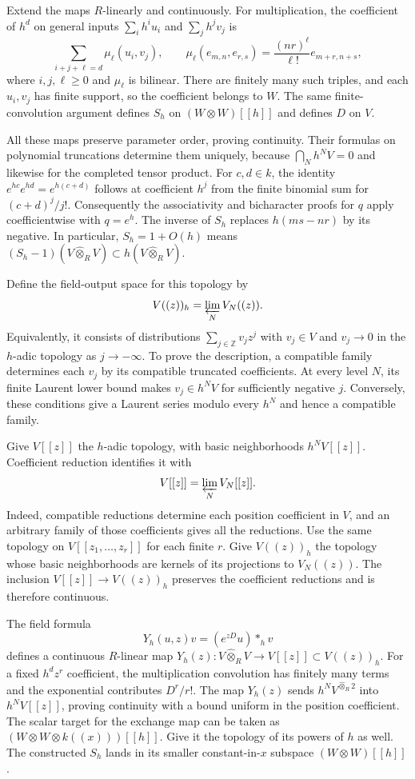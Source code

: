 Extend the maps $R$-linearly and continuously.
For multiplication, the coefficient of $h^d$ on general inputs
$\sum_i h^iu_i$ and $\sum_j h^jv_j$ is
\[
 \sum_{i+j+\ell=d}\mu_\ell(u_i,v_j),\qquad
 \mu_\ell(e_{m,n},e_{r,s})=\frac{(nr)^\ell}{\ell!}e_{m+r,n+s},
\]
where $i,j,\ell\geq0$ and $\mu_\ell$ is bilinear.
There are finitely many such triples, and each $u_i,v_j$ has
finite support, so the coefficient belongs to $W$.
The same finite-convolution argument defines $S_h$ on
$(W\otimes W)[[h]]$ and defines $D$ on $V$.

All these maps preserve parameter order, proving continuity.
Their formulas on polynomial truncations determine them uniquely, because
$\bigcap_Nh^NV=0$ and likewise for the completed tensor product.
For $c,d\in k$, the identity $e^{hc}e^{hd}=e^{h(c+d)}$ follows at coefficient $h^j$
from the finite binomial sum for $(c+d)^j/j!$.
Consequently the associativity and bicharacter proofs for $q$ apply
coefficientwise with $q=e^h$.
The inverse of $S_h$ replaces $h(ms-nr)$ by its negative.
In particular, $S_h=1+O(h)$ means $(S_h-1)(V\widehat\otimes_RV)
\subset h(V\widehat\otimes_RV)$.

Define the field-output space for this topology by
\[
 V((z))_h=\varprojlim_N V_N((z)).
\]
Equivalently, it consists of distributions $\sum_{j\in\mathbb Z}v_jz^j$
with $v_j\in V$ and $v_j\to0$ in the $h$-adic topology as
$j\to-\infty$.
To prove the description, a compatible family determines each $v_j$
by its compatible truncated coefficients.
At every level $N$, its finite Laurent lower bound makes
$v_j\in h^NV$ for sufficiently negative $j$.
Conversely, these conditions give a Laurent series modulo every $h^N$
and hence a compatible family.

Give $V[[z]]$ the $h$-adic topology, with basic neighborhoods
$h^NV[[z]]$.
Coefficient reduction identifies it with
\[
 V[[z]]=\varprojlim_N V_N[[z]].
\]
Indeed, compatible reductions determine each position coefficient in $V$,
and an arbitrary family of those coefficients gives all the reductions.
Use the same topology on $V[[z_1,\ldots,z_r]]$ for each finite $r$.
Give $V((z))_h$ the topology whose basic neighborhoods are kernels
of its projections to $V_N((z))$.
The inclusion $V[[z]]\to V((z))_h$ preserves the coefficient
reductions and is therefore continuous.

The field formula
\[
 Y_h(u,z)v=(e^{zD}u)*_h v
\]
defines a continuous $R$-linear map
$Y_h(z):V\widehat\otimes_RV\to V[[z]]\subset V((z))_h$.
For a fixed $h^dz^r$ coefficient, the multiplication convolution
has finitely many terms and the exponential contributes $D^r/r!$.
The map $Y_h(z)$ sends $h^NV^{\widehat\otimes_R2}$ into
$h^NV[[z]]$, proving continuity with a bound uniform in the position coefficient.
The scalar target for the exchange map can be taken as
$(W\otimes W\otimes k((x)))[[h]]$.
Give it the topology of its powers of $h$ as well.
The constructed $S_h$ lands in its smaller constant-in-$x$ subspace
$(W\otimes W)[[h]]$.

